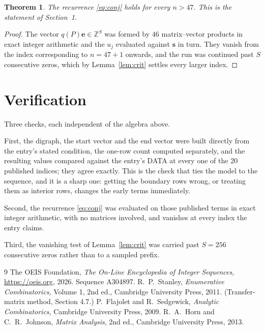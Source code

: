 \documentclass[11pt,a4paper]{article}
\theoremstyle{plain}
\newtheorem{theorem}{Theorem}
\theoremstyle{definition}
\begin{document}
\begin{theorem}
The recurrence \eqref{eq:conj} holds for every $n>47$. This is the statement of
Section~1.
\end{theorem}

\begin{proof}
The vector $q(P)\mathbf{e}\in\mathbb{Z}^{S}$ was formed by $46$ matrix--vector
products in exact integer arithmetic and the $u_j$ evaluated against $\mathbf{s}$ in turn.
They vanish from the index corresponding to $n=47+1$ onwards, and the run was continued
past $S$ consecutive zeros, which by Lemma~\ref{lem:crit} settles every larger index.
\end{proof}

\section{Verification}

Three checks, each independent of the algebra above.

First, the digraph, the start vector and the end vector were built directly from the
entry's stated condition, the one-row count computed separately, and the resulting values
compared against the entry's DATA at every one of the $20$ published indices; they
agree exactly. This is the check that ties the model to the sequence, and it is a sharp one:
getting the boundary rows wrong, or treating them as interior rows, changes the early terms
immediately.

Second, the recurrence \eqref{eq:conj} was evaluated on those published terms in exact
integer arithmetic, with no matrices involved, and vanishes at every index the entry claims.

Third, the vanishing test of Lemma~\ref{lem:crit} was carried past $S=256$ consecutive
zeros rather than to a sampled prefix.

\begin{thebibliography}{9}
 The OEIS Foundation, \emph{The On-Line Encyclopedia of Integer
Sequences}, \url{https://oeis.org}, 2026. Sequence A304897.
 R.~P.~Stanley, \emph{Enumerative Combinatorics}, Volume 1, 2nd ed.,
Cambridge University Press, 2011. (Transfer-matrix method, Section 4.7.)
 P.~Flajolet and R.~Sedgewick, \emph{Analytic Combinatorics}, Cambridge
University Press, 2009.
 R.~A.~Horn and C.~R.~Johnson, \emph{Matrix Analysis}, 2nd ed., Cambridge
University Press, 2013.
\end{thebibliography}
\end{document}
